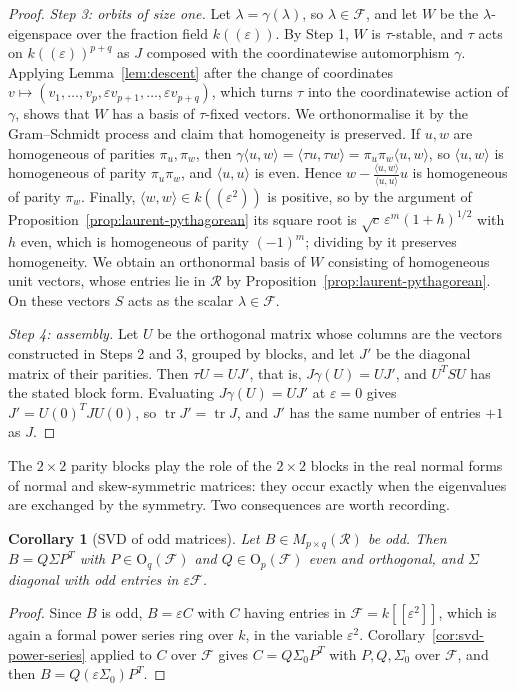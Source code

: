 \documentclass[12pt, a4paper]{report}
\theoremstyle{plain}
\newtheorem{corollary}[theorem]{Corollary}
\theoremstyle{definition}
\theoremstyle{remark}
\theoremstyle{plain}
\newcommand{\Or}{\mathrm{O}}
\newcommand{\tr}{\operatorname{tr}}
\begin{document}
\begin{proof}
\emph{Step 3: orbits of size one.} Let $\lambda=\gamma(\lambda)$, so $\lambda\in\mathcal F$, and let $W$ be the $\lambda$-eigenspace over the fraction field $k((\varepsilon))$. By Step 1, $W$ is $\tau$-stable, and $\tau$ acts on $k((\varepsilon))^{p+q}$ as $J$ composed with the coordinatewise automorphism $\gamma$. Applying Lemma~\ref{lem:descent} after the change of coordinates $v\mapsto(v_1,\dots,v_p,\varepsilon v_{p+1},\dots,\varepsilon v_{p+q})$, which turns $\tau$ into the coordinatewise action of $\gamma$, shows that $W$ has a basis of $\tau$-fixed vectors. We orthonormalise it by the Gram--Schmidt process and claim that homogeneity is preserved. If $u,w$ are homogeneous of parities $\pi_u,\pi_w$, then $\gamma\langle u,w\rangle=\langle\tau u,\tau w\rangle=\pi_u\pi_w\langle u,w\rangle$, so $\langle u,w\rangle$ is homogeneous of parity $\pi_u\pi_w$, and $\langle u,u\rangle$ is even. Hence $w-\frac{\langle u,w\rangle}{\langle u,u\rangle}u$ is homogeneous of parity $\pi_w$. Finally, $\langle w,w\rangle\in k((\varepsilon^2))$ is positive, so by the argument of Proposition~\ref{prop:laurent-pythagorean} its square root is $\sqrt c\,\varepsilon^{m}(1+h)^{1/2}$ with $h$ even, which is homogeneous of parity $(-1)^m$; dividing by it preserves homogeneity. We obtain an orthonormal basis of $W$ consisting of homogeneous unit vectors, whose entries lie in $\mathcal R$ by Proposition~\ref{prop:laurent-pythagorean}. On these vectors $S$ acts as the scalar $\lambda\in\mathcal F$.

\emph{Step 4: assembly.} Let $U$ be the orthogonal matrix whose columns are the vectors constructed in Steps 2 and 3, grouped by blocks, and let $J'$ be the diagonal matrix of their parities. Then $\tau U=UJ'$, that is, $J\gamma(U)=UJ'$, and $U^TSU$ has the stated block form. Evaluating $J\gamma(U)=UJ'$ at $\varepsilon=0$ gives $J'=U(0)^TJU(0)$, so $\tr J'=\tr J$, and $J'$ has the same number of entries $+1$ as $J$.
\end{proof}

The $2\times2$ parity blocks play the role of the $2\times2$ blocks in the real normal forms of normal and skew-symmetric matrices: they occur exactly when the eigenvalues are exchanged by the symmetry. Two consequences are worth recording.

\begin{corollary}[SVD of odd matrices]\label{cor:odd-svd}
Let $B\in M_{p\times q}(\mathcal R)$ be odd. Then $B=Q\Sigma P^T$ with $P\in\Or_q(\mathcal F)$ and $Q\in\Or_p(\mathcal F)$ even and orthogonal, and $\Sigma$ diagonal with odd entries in $\varepsilon\mathcal F$.
\end{corollary}
\begin{proof}
Since $B$ is odd, $B=\varepsilon C$ with $C$ having entries in $\mathcal F=k[[\varepsilon^2]]$, which is again a formal power series ring over $k$, in the variable $\varepsilon^2$. Corollary~\ref{cor:svd-power-series} applied to $C$ over $\mathcal F$ gives $C=Q\Sigma_0P^T$ with $P,Q,\Sigma_0$ over $\mathcal F$, and then $B=Q(\varepsilon\Sigma_0)P^T$.
\end{proof}
\end{document}
